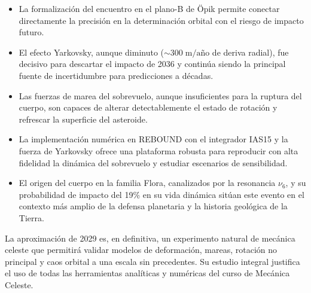 \documentclass[a4paper]{article}
\begin{document}
\begin{itemize}
  \item La formalización del encuentro en el plano-B de Öpik permite conectar directamente la precisión en la determinación orbital con el riesgo de impacto futuro.
  \item El efecto Yarkovsky, aunque diminuto ($\sim 300\;\text{m/año}$ de deriva radial), fue decisivo para descartar el impacto de 2036 y continúa siendo la principal fuente de incertidumbre para predicciones a décadas.
  \item Las fuerzas de marea del sobrevuelo, aunque insuficientes para la ruptura del cuerpo, son capaces de alterar detectablemente el estado de rotación y refrescar la superficie del asteroide.
  \item La implementación numérica en REBOUND con el integrador IAS15 y la fuerza de Yarkovsky ofrece una plataforma robusta para reproducir con alta fidelidad la dinámica del sobrevuelo y estudiar escenarios de sensibilidad.
  \item El origen del cuerpo en la familia Flora, canalizados por la resonancia $\nu_6$, y su probabilidad de impacto del 19\% en su vida dinámica sitúan este evento en el contexto más amplio de la defensa planetaria y la historia geológica de la Tierra.
\end{itemize}

La aproximación de 2029 es, en definitiva, un experimento natural de mecánica celeste que permitirá validar modelos de deformación, mareas, rotación no principal y caos orbital a una escala sin precedentes. Su estudio integral justifica el uso de todas las herramientas analíticas y numéricas del curso de Mecánica Celeste.



\end{document}
